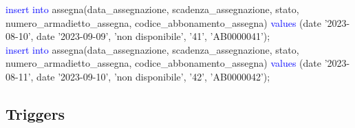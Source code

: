 \documentclass{article}
\begin{document}
\begin{flushleft}
{        \vspace{2mm}
        \hspace*{0.5em}\textcolor{blue}{insert into} assegna(data\_assegnazione, scadenza\_assegnazione, stato, \hspace*{0.5em}numero\_armadietto\_assegna, codice\_abbonamento\_assegna) \textcolor{blue}{values} \hspace*{0.5em}(date \hspace*{0.5em}'2023-08-10', date '2023-09-09', 'non disponibile', '41', 'AB0000041'); \\
        \vspace{2mm}
        \hspace*{0.5em}\textcolor{blue}{insert into} assegna(data\_assegnazione, scadenza\_assegnazione, stato, \hspace*{0.5em}numero\_armadietto\_assegna, codice\_abbonamento\_assegna) \textcolor{blue}{values} \hspace*{0.5em}(date \hspace*{0.5em}'2023-08-11', date '2023-09-10', 'non disponibile', '42', 'AB0000042'); \\}
    \end{flushleft}
    
\newpage
\subsection{Triggers}
\end{document}
